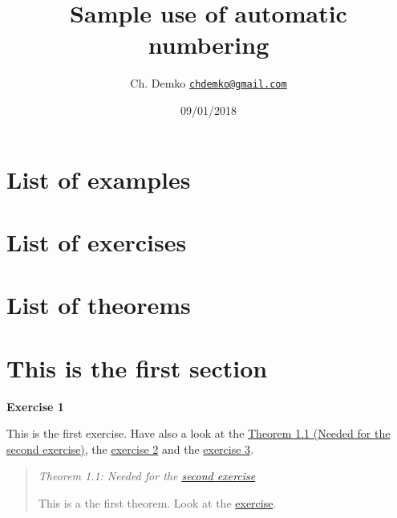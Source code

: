 \documentclass[]{article}
\title{Sample use of automatic numbering}
\author{Ch. Demko \href{mailto:chdemko@gmail.com}{\nolinkurl{chdemko@gmail.com}}}
\date{09/01/2018}
\begin{document}
\maketitle

\section*{List of examples}

\hypersetup{linkcolor=black}\makeatletter\newcommand*{}\makeatother

\section*{List of exercises}

\hypersetup{linkcolor=black}\makeatletter\newcommand*{}\makeatother

\section*{List of theorems}

\hypersetup{linkcolor=black}\makeatletter\newcommand*{}\makeatother

\hypertarget{this-is-the-first-section}{%
\section{This is the first section}\label{this-is-the-first-section}}

\protect\hypertarget{exercise:1}{}{\label{exercise:1}\textbf{Exercise
1}}

This is the first exercise. Have also a look at the
\protect\hyperlink{theorem:first}{{Theorem 1.1 (Needed for the
\protect\hyperlink{exercise:second}{second exercise})}}, the
\protect\hyperlink{exercise:second}{{exercise 2}} and the
\protect\hyperlink{exercise:last}{{exercise 3}}.

\begin{quote}
\protect\hypertarget{theorem:first}{}{\label{theorem:first}\emph{Theorem
1.1: Needed for the \protect\hyperlink{exercise:second}{second
exercise}}}

This is a the first theorem. Look at the
\protect\hyperlink{exercise:second}{exercise}.
\end{quote}
\end{document}
